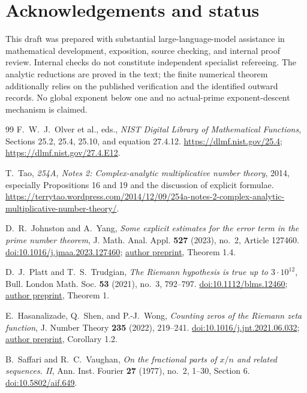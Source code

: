 \documentclass[11pt]{article}
\theoremstyle{remark}
\numberwithin{equation}{section}
\begin{document}
\section*{Acknowledgements and status}
This draft was prepared with substantial large-language-model assistance
in mathematical development, exposition, source checking, and internal
proof review. Internal checks do not constitute independent specialist
refereeing. The analytic reductions are proved in the text; the finite
numerical theorem additionally relies on the published verification and
the identified outward records. No global exponent below one and no
actual-prime exponent-descent mechanism is claimed.

\begin{thebibliography}{99}
F.~W.~J.~Olver et al., eds.,
\emph{NIST Digital Library of Mathematical Functions},
Sections 25.2, 25.4, 25.10, and equation 27.4.12.
\url{https://dlmf.nist.gov/25.4};
\url{https://dlmf.nist.gov/27.4.E12}.

T.~Tao, \emph{254A, Notes 2: Complex-analytic multiplicative number
theory}, 2014, especially Propositions 16 and 19 and the discussion
of explicit formulae.
\url{https://terrytao.wordpress.com/2014/12/09/254a-notes-2-complex-analytic-multiplicative-number-theory/}.

D.~R.~Johnston and A.~Yang,
\emph{Some explicit estimates for the error term in the prime number theorem},
J. Math. Anal. Appl. \textbf{527} (2023), no.~2, Article 127460.
\href{https://doi.org/10.1016/j.jmaa.2023.127460}{doi:10.1016/j.jmaa.2023.127460};
\href{https://arxiv.org/abs/2204.01980v2}{author preprint}, Theorem 1.4.

D.~J.~Platt and T.~S.~Trudgian,
\emph{The Riemann hypothesis is true up to $3\cdot10^{12}$},
Bull. London Math. Soc. \textbf{53} (2021), no.~3, 792--797.
\href{https://doi.org/10.1112/blms.12460}{doi:10.1112/blms.12460};
\href{https://arxiv.org/abs/2004.09765v1}{author preprint}, Theorem 1.

E.~Hasanalizade, Q.~Shen, and P.-J.~Wong,
\emph{Counting zeros of the Riemann zeta function},
J. Number Theory \textbf{235} (2022), 219--241.
\href{https://doi.org/10.1016/j.jnt.2021.06.032}{doi:10.1016/j.jnt.2021.06.032};
\href{https://arxiv.org/abs/2107.06506v1}{author preprint}, Corollary 1.2.

B.~Saffari and R.~C.~Vaughan,
\emph{On the fractional parts of $x/n$ and related sequences. II},
Ann. Inst. Fourier \textbf{27} (1977), no.~2, 1--30, Section 6.
\href{https://doi.org/10.5802/aif.649}{doi:10.5802/aif.649}.


\end{thebibliography}
\end{document}
